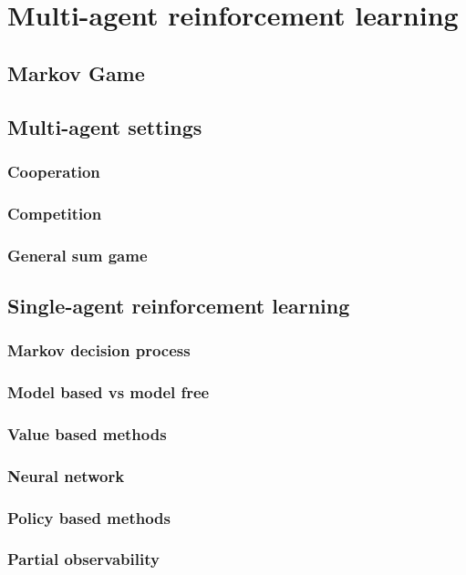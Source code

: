 \chapter{Multi-agent reinforcement learning}\label{ch:marl}

\section{Markov Game}
\section{Multi-agent settings}
\subsection{Cooperation}
\subsection{Competition}
\subsection{General sum game}
\section{Single-agent reinforcement learning}
\subsection{Markov decision process}
\subsection{Model based vs model free}
\subsection{Value based methods}
\subsection{Neural network}
\subsection{Policy based methods}
\subsection{Partial observability}